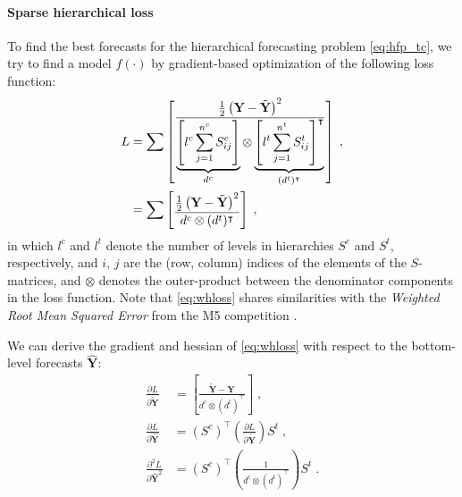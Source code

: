 \documentclass[preprint, 3p, times, twocolumn]{elsarticle}
\begin{document}
\paragraph{Sparse hierarchical loss} To find the best forecasts for the hierarchical forecasting problem \eqref{eq:hfp_tc}, we try to find a model \(f(\cdot)\) by gradient-based optimization of the following loss function:
\begin{align} \label{eq:whloss}
  L &= \sum \left[ \vcenter{\hbox{$\displaystyle \frac{ \frac{1}{2}\left(\textbf{Y} - \tilde{\textbf{Y}}\right)^2}{ \underbrace{\left[ l^{c} \sum_{j=1}^{n^c} S^c_{ij} \right]}_{d^c} \otimes \underbrace{\left[ l^{t} \sum_{j=1}^{n^t} S^t_{ij} \right]^\intercal}_{(d^t)^\intercal} } $}} \right] \; , \\
    &= \sum \left[ \vcenter{\hbox{$\displaystyle \frac{ \frac{1}{2}\left(\textbf{Y} - \tilde{\textbf{Y}}\right)^2}{ d^c \otimes (d^t)^\intercal } $}} \right] \; ,
\end{align}
in which \(l^{c}\) and \(l^{t}\) denote the number of levels in hierarchies \(S^c\) and \(S^t\), respectively, and \(i,\,j\) are the (row, column) indices of the elements of the \(S\)-matrices, and \(\otimes\) denotes the outer-product between the denominator components in the loss function. Note that \eqref{eq:whloss} shares similarities with the \textit{Weighted Root Mean Squared Error} from the M5 competition \cite{makridakis_m5_2022}.

We can derive the gradient and hessian of \eqref{eq:whloss} with respect to the bottom-level forecasts \(\hat{\textbf{Y}}\): 
\begin{align} 
  \frac{\partial L}{\partial \tilde{\textbf{Y}}} &=  \left[ \frac{\tilde{\textbf{Y}} - \textbf{Y}}{ d^c \otimes (d^t)^\intercal } \right] \;, \label{eq:hfp_grad} \\
  \frac{\partial L}{\partial \hat{\textbf{Y}}} &= (S^c)^\intercal \left(\frac{\partial L}{\partial \tilde{\textbf{Y}}}\right) S^t \;, \label{eq:hfpbu_grad}  \\
  \frac{\partial^2 L}{\partial \hat{\textbf{Y}}^2} &= (S^c)^\intercal \left( \frac{1}{d^c \otimes (d^t)^\intercal} \right) S^t \;. \label{eq:hfpbu_hess}                                         
\end{align}
\end{document}
